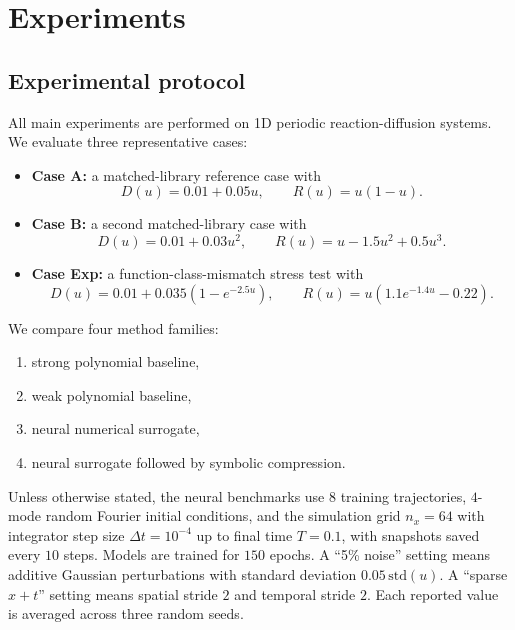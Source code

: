 \documentclass[preprint,12pt]{elsarticle}
\begin{document}
\section{Experiments}

\subsection{Experimental protocol}

All main experiments are performed on 1D periodic reaction-diffusion systems. We evaluate three representative cases:
\begin{itemize}[leftmargin=1.5em]
\item \textbf{Case A:} a matched-library reference case with
\begin{equation*}
D(u) = 0.01 + 0.05u, \qquad R(u) = u(1-u).
\end{equation*}
\item \textbf{Case B:} a second matched-library case with
\begin{equation*}
D(u) = 0.01 + 0.03u^2, \qquad R(u) = u - 1.5u^2 + 0.5u^3.
\end{equation*}
\item \textbf{Case Exp:} a function-class-mismatch stress test with
\begin{equation*}
D(u) = 0.01 + 0.035(1-e^{-2.5u}), \qquad R(u) = u(1.1e^{-1.4u} - 0.22).
\end{equation*}
\end{itemize}

We compare four method families:
\begin{enumerate}[leftmargin=1.5em]
\item strong polynomial baseline,
\item weak polynomial baseline,
\item neural numerical surrogate,
\item neural surrogate followed by symbolic compression.
\end{enumerate}
Unless otherwise stated, the neural benchmarks use $8$ training trajectories, $4$-mode random Fourier initial conditions, and the simulation grid $n_x=64$ with integrator step size $\Delta t=10^{-4}$ up to final time $T=0.1$, with snapshots saved every $10$ steps. Models are trained for $150$ epochs. A ``5\% noise'' setting means additive Gaussian perturbations with standard deviation $0.05\,\mathrm{std}(u)$. A ``sparse $x+t$'' setting means spatial stride $2$ and temporal stride $2$. Each reported value is averaged across three random seeds.
\end{document}
